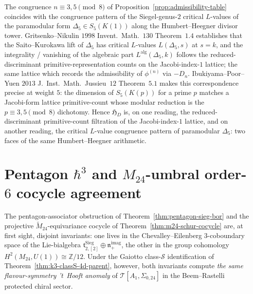\begin{remark}
\label{rem:paramodular-L-value-congruence}
The congruence $n \equiv 3, 5 \pmod 8$ of
Proposition~\ref{prop:admissibility-table} coincides with the
congruence pattern of the Siegel-genus-$2$ critical $L$-values of the
paramodular form $\Delta_5 \in S_5(K(1))$ along the
Humbert--Heegner divisor tower. Gritsenko--Nikulin $1998$
\textup{Invent.~Math.}~$130$ Theorem~$1.4$ establishes that the
Saito--Kurokawa lift of $\Delta_5$ has critical $L$-values
$L(\Delta_5, s)$ at $s = k$, and the integrality / vanishing of the
algebraic part $L^{\mathrm{alg}}(\Delta_5, k)$ follows the
reduced-discriminant primitive-representation counts on the
Jacobi-index-$1$ lattice; the same lattice which records the
admissibility of $\phi^{(n)}$ via $-D_n$. Ibukiyama--Poor--Yuen $2013$
\textup{J.~Inst.~Math.~Jussieu}~$12$ Theorem~$5.1$ makes this
correspondence precise at weight $5$: the dimension of
$S_5(K(p))$ for a prime $p$ matches a Jacobi-form lattice
primitive-count whose modular reduction is the
$p \equiv 3, 5 \pmod 8$ dichotomy. Hence $\mathfrak{H}_D$ is, on one
reading, the reduced-discriminant primitive-count filtration of the
Jacobi-index-$1$ lattice, and on another reading, the critical $L$-value
congruence pattern of paramodular $\Delta_5$: two faces of the same
Humbert--Heegner arithmetic.
\end{remark}

\section{Pentagon \texorpdfstring{$\hbar^3$}{hbar-3} and \texorpdfstring{$M_{24}$}{M-24}-umbral order-\texorpdfstring{$6$}{6} cocycle agreement}
\label{sec:pentagon-umbral-agreement}

The pentagon-associator obstruction of Theorem~\ref{thm:pentagon-sieg-bor} and the
projective $\widetilde{M}_{24}$-equivariance cocycle of
Theorem~\ref{thm:m24-schur-cocycle} are, at first sight, disjoint invariants: one
lives in the Chevalley--Eilenberg $3$-coboundary space of the Lie-bialgebra
$\mathfrak{t}^{\mathrm{Sieg}}_{2,[2]}\oplus\mathfrak{n}_+^{\mathrm{imag}}$, the other
in the group cohomology $H^2(M_{24}, U(1)) \cong \mathbb{Z}/12$. Under the Gaiotto
class-$\mathcal{S}$ identification of Theorem~\ref{thm:k3-classS-4d-parent}, however,
both invariants compute \emph{the same flavour-symmetry 't~Hooft anomaly} of
$\mathcal{T}[A_1,\Sigma_{0,24}]$ in the Beem--Rastelli protected chiral sector.

